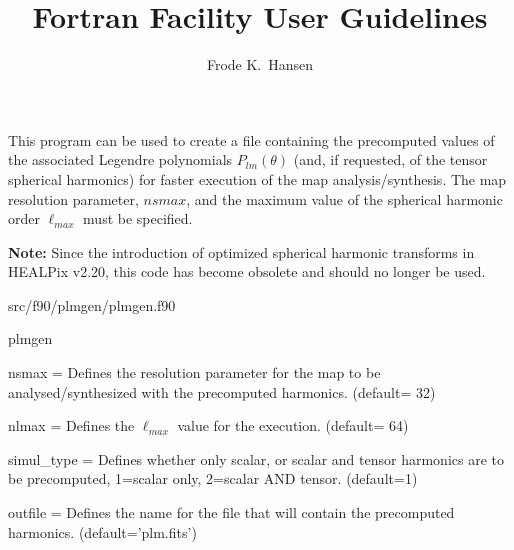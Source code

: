
\sloppy


\title{\healpix Fortran Facility User Guidelines}
 \section[plmgen]{\nosectionname}
\label{fac:plmgen}
\author{Frode K.~Hansen}

\begin{facility}
{This program can be used to create a file containing 
the precomputed values of the associated Legendre polynomials
$P_{lm}(\theta)$ (and, if requested, of the tensor spherical harmonics) 
for faster execution of the \healpix map analysis/synthesis. 
The  map resolution parameter, $nsmax$,
and the maximum value of the spherical harmonic order $\ell_{max}$
must be specified.

{\bf Note:} Since the introduction of optimized spherical harmonic transforms
in HEALPix v2.20, this code has become obsolete and should no longer be
used.}
{src/f90/plmgen/plmgen.f90}
\end{facility}

\begin{f90facility}
{plmgen}
\end{f90facility}

\begin{qualifiers}
  \begin{qulist}{} %
    \item[{nsmax = }]%
 Defines the resolution parameter for the map to 
be analysed/synthesized with the precomputed harmonics. 
	(default= 32)
    \item[{nlmax = }]%
 Defines the $\ell_{max}$ value for the execution.
(default= 64)
     \item[{simul\_type = }]%
 Defines whether only scalar, or scalar and 
tensor harmonics are to be precomputed, 1=scalar only, 2=scalar AND tensor.
(default=1)
\item[{outfile = }]%
 Defines the name for the file that will 
contain the precomputed harmonics.
(default='plm.fits')
  \end{qulist}
\end{qualifiers}

